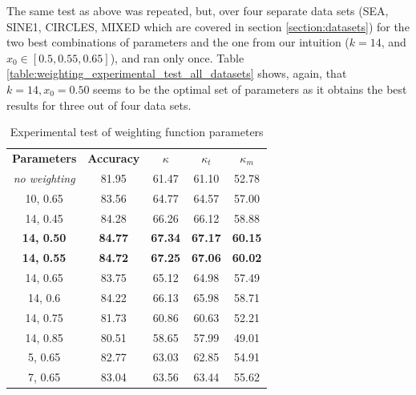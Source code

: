 The same test as above was repeated, but, over four separate data sets (SEA, SINE1, CIRCLES, MIXED which are covered in section \ref{section:datasets}) for the two best combinations of parameters and the one from our intuition ($k=14$, and $x_0 \in [0.5, 0.55, 0.65]$), and ran only once. Table \ref{table:weighting_experimental_test_all_datasets} shows, again, that $k=14, x_0=0.50$ seems to be the optimal set of parameters as it obtains the best results for three out of four data sets.

\begin{table}[]
\caption{\label{table:weighting_experimental_test}Experimental test of weighting function parameters}
\centering
\begin{tabular}{|c|c|c|c|c|}
\hline
\textbf{Parameters} & \textbf{Accuracy} & \textbf{$\kappa$} & \textbf{$\kappa_t$} & \textbf{$\kappa_m$} \\ \hhline{=====}
\textit{no weighting}&81.95&61.47&61.10&52.78 \\ \hline
10, 0.65&83.56&64.77&64.57&57.00 \\ \hline
14, 0.45&84.28&66.26&66.12&58.88 \\ \hline
\textbf{14, 0.50}&\textbf{84.77}&\textbf{67.34}&\textbf{67.17}&\textbf{60.15} \\ \hline
\textbf{14, 0.55}&\textbf{84.72}&\textbf{67.25}&\textbf{67.06}&\textbf{60.02} \\ \hline
14, 0.65&83.75&65.12&64.98&57.49 \\ \hline
14, 0.6&84.22&66.13&65.98&58.71 \\ \hline
14, 0.75&81.73&60.86&60.63&52.21 \\ \hline
14, 0.85&80.51&58.65&57.99&49.01 \\ \hline
5, 0.65&82.77&63.03&62.85&54.91 \\ \hline
7, 0.65&83.04&63.56&63.44&55.62 \\ \hline
\end{tabular}
\end{table}


